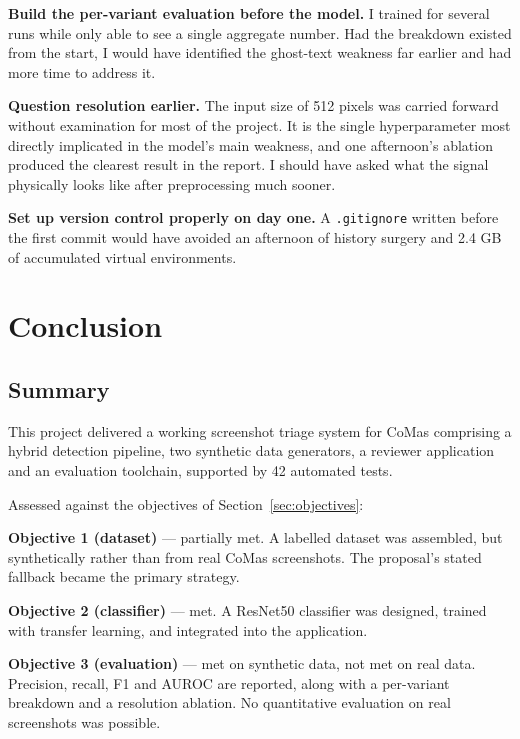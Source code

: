 \documentclass[12pt,oneside]{report}
\newcommand{\code}[1]{\texttt{\small #1}}
\begin{document}
\textbf{Build the per-variant evaluation before the model.} I trained for
several runs while only able to see a single aggregate number. Had the
breakdown existed from the start, I would have identified the ghost-text
weakness far earlier and had more time to address it.

\textbf{Question resolution earlier.} The input size of 512 pixels was carried
forward without examination for most of the project. It is the single
hyperparameter most directly implicated in the model's main weakness, and one
afternoon's ablation produced the clearest result in the report. I should have
asked what the signal physically looks like after preprocessing much sooner.

\textbf{Set up version control properly on day one.} A \code{.gitignore}
written before the first commit would have avoided an afternoon of history
surgery and 2.4 GB of accumulated virtual environments.

\chapter{Conclusion}
\label{ch:conclusion}

\section{Summary}

This project delivered a working screenshot triage system for CoMas comprising
a hybrid detection pipeline, two synthetic data generators, a reviewer
application and an evaluation toolchain, supported by 42 automated tests.

Assessed against the objectives of Section~\ref{sec:objectives}:

\textbf{Objective 1 (dataset)} --- partially met. A labelled dataset was
assembled, but synthetically rather than from real CoMas screenshots. The
proposal's stated fallback became the primary strategy.

\textbf{Objective 2 (classifier)} --- met. A ResNet50 classifier was designed,
trained with transfer learning, and integrated into the application.

\textbf{Objective 3 (evaluation)} --- met on synthetic data, not met on real
data. Precision, recall, F1 and AUROC are reported, along with a per-variant
breakdown and a resolution ablation. No quantitative evaluation on real
screenshots was possible.
\end{document}
